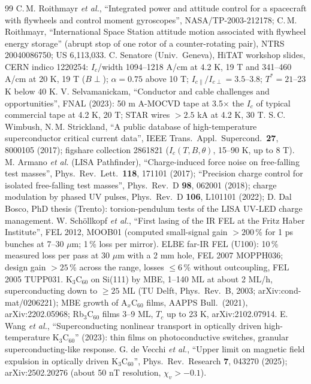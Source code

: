 \begin{thebibliography}{99}
 C.\,M. Roithmayr \emph{et al.}, ``Integrated power and attitude control for a spacecraft with flywheels and control moment gyroscopes'', NASA/TP-2003-212178; C.\,M. Roithmayr, ``International Space Station attitude motion associated with flywheel energy storage'' (abrupt stop of one rotor of a counter-rotating pair), NTRS 20040086750; US 6,113,033.
 C. Senatore (Univ.\ Geneva), HiTAT workshop slides, CERN indico 1220254: $I_c$/width 1094--1218 A/cm at 4.2 K, 19 T and 341--460 A/cm at 20 K, 19 T ($B\perp$); $\alpha=0.75$ above 10 T; $I_{c\parallel}/I_{c\perp}=3.5$--3.8; $T^*=21$--23 K below 40 K.
 V. Selvamanickam, ``Conductor and cable challenges and opportunities'', FNAL (2023): 50 m A-MOCVD tape at 3.5$\times$ the $I_c$ of typical commercial tape at 4.2 K, 20 T; STAR wires $>2.5$ kA at 4.2 K, 30 T.
 S.\,C. Wimbush, N.\,M. Strickland, ``A public database of high-temperature superconductor critical current data'', IEEE Trans.\ Appl.\ Supercond.\ \textbf{27}, 8000105 (2017); figshare collection 2861821 ($I_c(T,B,\theta)$, 15--90 K, up to 8 T).
 M. Armano \emph{et al.} (LISA Pathfinder), ``Charge-induced force noise on free-falling test masses'', Phys.\ Rev.\ Lett.\ \textbf{118}, 171101 (2017); ``Precision charge control for isolated free-falling test masses'', Phys.\ Rev.\ D \textbf{98}, 062001 (2018); charge modulation by phased UV pulses, Phys.\ Rev.\ D \textbf{106}, L101101 (2022); D. Dal Bosco, PhD thesis (Trento): torsion-pendulum tests of the LISA UV-LED charge management.
 W. Sch\"ollkopf \emph{et al.}, ``First lasing of the IR FEL at the Fritz Haber Institute'', FEL 2012, MOOB01 (computed small-signal gain $>200$\,\% for 1 ps bunches at 7--30 $\mu$m; 1\,\% loss per mirror).
 ELBE far-IR FEL (U100): 10\,\% measured loss per pass at 30 $\mu$m with a 2 mm hole, FEL 2007 MOPPH036; design gain $>25$\,\% across the range, losses $\le6$\,\% without outcoupling, FEL 2005 TUPP031.
 K$_3$C$_{60}$ on Si(111) by MBE, 1--140 ML at about 2 ML/h, superconducting down to $\ge25$ ML (TU Delft, Phys.\ Rev.\ B, 2003; arXiv:cond-mat/0206221); MBE growth of A$_x$C$_{60}$ films, AAPPS Bull.\ (2021), arXiv:2202.05968; Rb$_3$C$_{60}$ films 3--9 ML, $T_c$ up to 23 K, arXiv:2102.07914.
 E. Wang \emph{et al.}, ``Superconducting nonlinear transport in optically driven high-temperature K$_3$C$_{60}$'' (2023): thin films on photoconductive switches, granular superconducting-like response.
 G. de Vecchi \emph{et al.}, ``Upper limit on magnetic field expulsion in optically driven K$_3$C$_{60}$'', Phys.\ Rev.\ Research \textbf{7}, 043270 (2025); arXiv:2502.20276 (about 50 nT resolution, $\chi_v>-0.1$).

\end{thebibliography}

